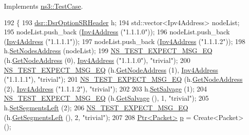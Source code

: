Implements \hyperlink{classns3_1_1TestCase_a8ff74680cf017ed42011e4be51917a24}{ns3\+::\+Test\+Case}.


\begin{DoxyCode}
192 \{
193   \hyperlink{classns3_1_1dsr_1_1DsrOptionSRHeader}{dsr::DsrOptionSRHeader} h;
194   std::vector<Ipv4Address> nodeList;
195   nodeList.push\_back (\hyperlink{classns3_1_1Ipv4Address}{Ipv4Address} (\textcolor{stringliteral}{"1.1.1.0"}));
196   nodeList.push\_back (\hyperlink{classns3_1_1Ipv4Address}{Ipv4Address} (\textcolor{stringliteral}{"1.1.1.1"}));
197   nodeList.push\_back (\hyperlink{classns3_1_1Ipv4Address}{Ipv4Address} (\textcolor{stringliteral}{"1.1.1.2"}));
198   h.\hyperlink{classns3_1_1dsr_1_1DsrOptionSRHeader_aede4f60ddf515ed837f9c0d64cf8dadd}{SetNodesAddress} (nodeList);
199   \hyperlink{group__testing_ga7304ba46a28d8cf08dfdfd6499cf7068}{NS\_TEST\_EXPECT\_MSG\_EQ} (h.\hyperlink{classns3_1_1dsr_1_1DsrOptionSRHeader_a2427743dfffec593db5b28148ebc68ce}{GetNodeAddress} (0), 
      \hyperlink{classns3_1_1Ipv4Address}{Ipv4Address} (\textcolor{stringliteral}{"1.1.1.0"}), \textcolor{stringliteral}{"trivial"});
200   \hyperlink{group__testing_ga7304ba46a28d8cf08dfdfd6499cf7068}{NS\_TEST\_EXPECT\_MSG\_EQ} (h.\hyperlink{classns3_1_1dsr_1_1DsrOptionSRHeader_a2427743dfffec593db5b28148ebc68ce}{GetNodeAddress} (1), 
      \hyperlink{classns3_1_1Ipv4Address}{Ipv4Address} (\textcolor{stringliteral}{"1.1.1.1"}), \textcolor{stringliteral}{"trivial"});
201   \hyperlink{group__testing_ga7304ba46a28d8cf08dfdfd6499cf7068}{NS\_TEST\_EXPECT\_MSG\_EQ} (h.\hyperlink{classns3_1_1dsr_1_1DsrOptionSRHeader_a2427743dfffec593db5b28148ebc68ce}{GetNodeAddress} (2), 
      \hyperlink{classns3_1_1Ipv4Address}{Ipv4Address} (\textcolor{stringliteral}{"1.1.1.2"}), \textcolor{stringliteral}{"trivial"});
202 
203   h.\hyperlink{classns3_1_1dsr_1_1DsrOptionSRHeader_a70a69c4774bf6dc7d5e840a2e5e67b71}{SetSalvage} (1);
204   \hyperlink{group__testing_ga7304ba46a28d8cf08dfdfd6499cf7068}{NS\_TEST\_EXPECT\_MSG\_EQ} (h.\hyperlink{classns3_1_1dsr_1_1DsrOptionSRHeader_a4d0ddd2d9930343280e1244e76a40935}{GetSalvage} (), 1, \textcolor{stringliteral}{"trivial"});
205   h.\hyperlink{classns3_1_1dsr_1_1DsrOptionSRHeader_ab4f451b0b38ab65c84c18d0c3cbb5fd9}{SetSegmentsLeft} (2);
206   \hyperlink{group__testing_ga7304ba46a28d8cf08dfdfd6499cf7068}{NS\_TEST\_EXPECT\_MSG\_EQ} (h.\hyperlink{classns3_1_1dsr_1_1DsrOptionSRHeader_a9e74c96e50e33ea7090300390101a0ab}{GetSegmentsLeft} (), 2, \textcolor{stringliteral}{"trivial"});
207 
208   \hyperlink{classns3_1_1Ptr}{Ptr<Packet>} \hyperlink{lte__link__budget_8m_ac9de518908a968428863f829398a4e62}{p} = Create<Packet> ();

\end{DoxyCode}
